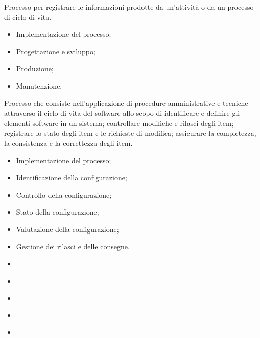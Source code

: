 Processo per registrare le informazioni prodotte da un'attività o
da un processo di ciclo di vita.
\begin{itemize}
    \item Implementazione del processo;
    \item Progettazione e sviluppo;
    \item Produzione;
    \item Manutenzione.
\end{itemize}

Processo che consiste nell'applicazione di procedure amministrative e tecniche
attraverso il ciclo di vita del software allo scopo di identificare e definire
gli elementi software in un sistema; controllare modifiche e rilasci degli item;
registrare lo stato degli item e le richieste di modifica; assicurare la completezza,
la consistenza e la correttezza degli item.
\begin{itemize}
    \item Implementazione del processo;
    \item Identificazione della configurazione;
    \item Controllo della configurazione;
    \item Stato della configurazione;
    \item Valutazione della configurazione;
    \item Gestione dei rilasci e delle consegne.
\end{itemize}

\begin{itemize}
    \item 
\end{itemize}

\begin{itemize}
    \item 
\end{itemize}

\begin{itemize}
    \item 
\end{itemize}

\begin{itemize}
    \item 
\end{itemize}

\begin{itemize}
    \item 
\end{itemize}

